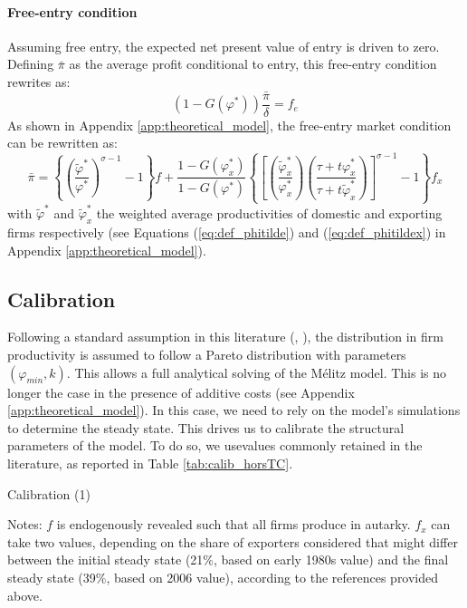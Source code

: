 \documentclass[a4paper,11pt]{article}
\begin{document}
\paragraph{Free-entry condition} Assuming free entry, the expected net present value of entry is driven to zero.
Defining $\bar{\pi}$ as the average profit conditional to entry, this free-entry condition rewrites as:
\begin{equation}
\left(1-G(\varphi^\ast)\right)\frac{\bar{\pi}}{\delta} = f_e \label{eq:FEC}
\end{equation}
As shown in Appendix \ref{app:theoretical_model}, the free-entry market condition can be rewritten as:
\begin{equation}
\bar{\pi} = \left\{\left(\frac{\widetilde{\varphi}^\ast}{\varphi^\ast}\right)^{\sigma-1}-1 \right\}f +  \frac{1-G(\varphi_x^\ast)}{1-G(\varphi^\ast)}\left\{\left[\left(\frac{\widetilde{\varphi}_x^\ast}{\varphi_x^\ast}\right)\left(\frac{\tau+ t \varphi^\ast_x}{\tau+ t \widetilde{\varphi}^\ast_x}\right)\right]^{\sigma-1}-1 \right\}f_x \label{eq:ZCP}
\end{equation}
\noindent with $\widetilde{\varphi}^\ast$ and $\widetilde{\varphi}_x^\ast$ the weighted average productivities of domestic and exporting firms respectively (see Equations (\ref{eq:def_phitilde}) and (\ref{eq:def_phitildex}) in Appendix \ref{app:theoretical_model}).


\subsection{Calibration}

Following a standard assumption in this literature (\cite{Irrazabal_2015}, \cite{melitz-redding-Handbk-IT-2014}), the distribution in firm productivity is assumed to follow a Pareto distribution with parameters $(\varphi_{min},k)$. This allows a full analytical solving of the M\'{e}litz model. This is no longer the case in the presence of additive costs (see Appendix \ref{app:theoretical_model}). In this case, we need to rely on the model's simulations to determine the steady state. This drives us to calibrate the structural parameters of the model. To do so, we usevalues commonly retained in the literature, as reported in Table \ref{tab:calib_horsTC}.

\begin{table}[htb]
  \centering
  \caption{Calibration (1)} \label{tab:calib_horsTC}
\begin{center}
	
\end{center}
{\parbox[l]{13cm}{ \vspace{4pt}\footnotesize{Notes: $f$ is endogenously revealed such that all firms produce in autarky. $f_x$ can take two values, depending on the share of exporters considered that might differ between the initial steady state (21\%, based on early 1980s value) and the final steady state (39\%, based on 2006 value), according to the references provided above.}}}
\end{table}
\end{document}

